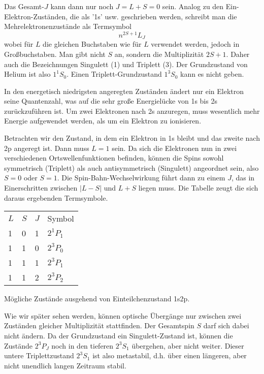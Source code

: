 Das Gesamt-$J$ kann dann nur noch $J  = L + S = 0$ sein.  Analog zu den Ein-Elektron-Zuständen, die als '1s' usw. geschrieben werden, schreibt man die Mehrelektronenzustände als Termsymbol
\begin{equation}
    n^{2S + 1}L_{J}
\end{equation}
wobei für $L$ die gleichen Buchstaben wie für $L$ verwendet werden, jedoch in Großbuchstaben. Man gibt nicht $S$ an, sondern die Multiplizität $2S+1$. Daher auch die Bezeichnungen Singulett (1) und Triplett (3). Der Grundzustand von Helium ist also $1^1S_0$. Einen Triplett-Grundzustand $1^3S_0$ kann es nicht geben.

In den energetisch niedrigsten angeregten Zuständen ändert nur ein Elektron seine Quantenzahl, was auf die sehr große Energielücke von 1s bis 2s zurückzuführen ist. Um zwei Elektronen nach 2s anzuregen, muss wesentlich mehr Energie aufgewendet werden, als um ein Elektron zu ionisieren.

Betrachten wir den Zustand, in dem ein Elektron in 1s bleibt und das zweite nach 2p angeregt ist. Dann muss $L=1$ sein. Da sich die Elektronen nun in zwei verschiedenen Ortswellenfunktionen befinden, können die Spins sowohl symmetrisch (Triplett) als auch antisymmetrisch (Singulett) angeordnet sein, also $S=0$ oder $S=1$. Die Spin-Bahn-Wechselwirkung führt dann zu einem $J$, das in Einerschritten zwischen $|L - S|$ und $L+S$ liegen muss. Die Tabelle zeugt die sich daraus ergebenden Termsymbole.

\begin{marginfigure}
   \begin{tabular}{llll}
    $L$ & $S$ & $J$ & Symbol \\
    1   & 0  &  1 & $2^1P_1$ \\
    1   & 1 &  0 & $2^3P_0$ \\
    1   & 1  &  1 & $2^3P_1$ \\
    1   & 1  &  2 & $2^3P_2$ \\
\end{tabular} 
\caption{Mögliche Zustände ausgehend von Einteilchenzustand 1s2p.}
\end{marginfigure}

Wie wir später sehen werden, können optische Übergänge nur zwischen zwei Zuständen gleicher Multiplizität stattfinden. Der Gesamtspin $S$ darf sich dabei nicht ändern. Da der Grundzustand ein Singulett-Zustand ist, können die Zustände $2^3P_J$ noch in den tieferen $2^3S_1$ übergehen, aber nicht weiter. Dieser untere Triplettzustand $2^3S_1$ ist also metastabil, d.h. über einen längeren, aber nicht unendlich langen Zeitraum stabil.


